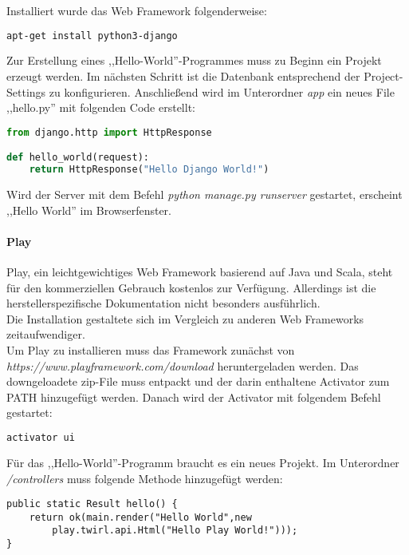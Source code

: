 Installiert wurde das Web Framework folgenderweise:
\begin{lstlisting}[caption={Installation von Django\cite{DJANGOIN}}, language=bash]
apt-get install python3-django
\end{lstlisting}

Zur Erstellung eines ,,Hello-World''-Programmes muss zu Beginn ein Projekt erzeugt werden. Im nächsten Schritt ist die Datenbank entsprechend der Project-Settings zu konfigurieren. Anschließend wird im Unterordner \textit{app} ein neues File ,,hello.py'' mit folgenden Code erstellt:

\begin{lstlisting}[caption={Django Hello-World \cite{DJANGOCODE}}, language=Python]
from django.http import HttpResponse

def hello_world(request):
	return HttpResponse("Hello Django World!")
\end{lstlisting}

Wird der Server mit dem Befehl \textit{python manage.py runserver} gestartet, erscheint ,,Hello World'' im Browserfenster.

\paragraph{Play}
Play, ein leichtgewichtiges Web Framework basierend auf Java und Scala, steht für den kommerziellen Gebrauch kostenlos zur Verfügung. Allerdings ist die herstellerspezifische Dokumentation nicht besonders ausführlich.\\
Die Installation gestaltete sich im Vergleich zu anderen Web Frameworks zeitaufwendiger. \cite{PLAY}
\\
Um Play zu installieren muss das Framework zunächst von\\
\textit{https://www.playframework.com/download} heruntergeladen werden. Das downgeloadete zip-File muss entpackt und der darin enthaltene Activator zum PATH hinzugefügt werden. Danach wird der Activator mit folgendem Befehl gestartet\cite{PLAYCON}:
\begin{lstlisting}[caption={Konifiguration von Play \cite{PLAYCON}}, language=bash]
activator ui
\end{lstlisting}

Für das ,,Hello-World''-Programm braucht es ein neues Projekt. Im Unterordner \textit{/controllers} muss folgende Methode hinzugefügt werden:

\begin{lstlisting}[caption={Play Hello-World \cite{PLAYCON}}]
public static Result hello() {
	return ok(main.render("Hello World",new
		play.twirl.api.Html("Hello Play World!")));
}
\end{lstlisting}

